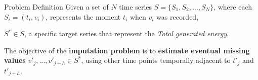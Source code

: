 \begin{frame}{Problem Definition}
    Given a set of $N$ time series $S = \{S_1, S_2, \ldots, S_N\}$,
    where each $S_i = \left(t_i, v_i\right)$, represents the moment $t_i$ when $v_i$ was recorded,

    $S^* \in S$, a specific target series that represent the \textit{Total generated energy},

    The objective of the \textbf{imputation problem} is to \textbf{estimate eventual missing values} $v′_j, \ldots,v′_{j+h} \in S^*$, using other time points temporally adjacent to $t′_j$ and $t′_{j+h}$.
\end{frame}